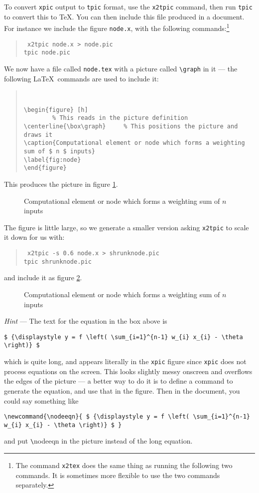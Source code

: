To convert {\tt xpic} output to {\tt tpic} format, use the {\tt x2tpic}
command, then run {\tt tpic} to convert this to \TeX. You can then include
this \tex file produced in a document. For instance we include the
figure
{\tt node.x}, with the following commands:\footnote{
The command {\tt x2tex} does the same thing as running the following two
commands. It is sometimes more flexible to use the two commands separately.}
\begin{quote}
\tt
x2tpic node.x > node.pic \\
tpic node.pic 
\end{quote}
We now have a file called {\tt node.tex} with a picture called
{\tt\verb+\graph+} in it --- the following \LaTeX\
commands are used to include it:
\begin{quote}
\tt
\begin{verbatim}
\begin{figure} [h]
		% This reads in the picture definition
\centerline{\box\graph}		% This positions the picture and draws it
\caption{Computational element or node which forms a weighting 
sum of $ n $ inputs}
\label{fig:node}
\end{figure}
\end{verbatim}
\end{quote}
This produces the picture in figure \ref{fig:node}.
\begin{figure} [h]

\centerline{\box\graph}
\caption{Computational element or node which forms a weighting 
sum of $ n $ inputs}
\label{fig:node}
\end{figure}
The figure is little large, so we generate a smaller version asking
{\tt x2tpic} to scale it down for us with:
\begin{quote}
\tt
x2tpic -s 0.6 node.x > shrunknode.pic \\
tpic shrunknode.pic 
\end{quote}
and include it as figure \ref{fig:shrunknode}.
\begin{figure}[h]

\centerline{\box\graph}
\caption{Computational element or node which forms a weighting 
sum of $ n $ inputs}
\label{fig:shrunknode}
\end{figure}
\par
{\small {\em Hint} --- The text for the equation
in the box above is 
\begin{verbatim}
$ {\displaystyle y = f \left( \sum_{i=1}^{n-1} w_{i} x_{i} - \theta \right)} $
\end{verbatim}
which is quite long, and appears literally in the {\tt xpic} figure
since {\tt xpic} does not process equations on the screen.  This looks
slightly messy onscreen and overflows the edges of the picture --- a
better way to do it is to define a command to generate the equation,
and use that in the figure. Then in the document, you could say
something like
\begin{verbatim}
\newcommand{\nodeeqn}{ $ {\displaystyle y = f \left( \sum_{i=1}^{n-1} 
w_{i} x_{i} - \theta \right)} $ }
\end{verbatim}
and put \verb+\+nodeeqn in the picture instead of the long equation.}
